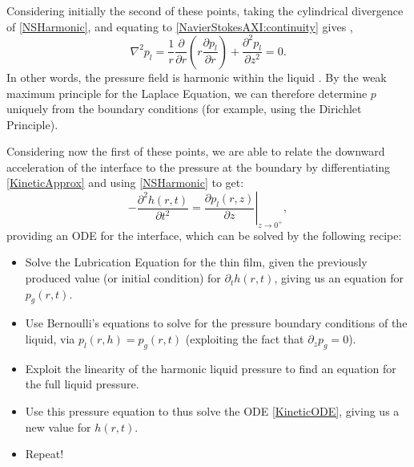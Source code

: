 \documentclass[11pt,a4paper]{article}
\begin{document}
	Considering initially the second of these points, taking the cylindrical divergence of \eqref{NSHarmonic}, and equating to \eqref{NavierStokesAXI:continuity} gives ,
	\begin{equation}
		\label{PressureLaplace}
		\nabla ^2 p_l = \frac{1}{r}\frac{\partial}{\partial r}\left(r \frac{\partial p_l}{\partial r}\right) + \frac{\partial^2 p_l}{\partial z^2} = 0.
	\end{equation}
	In other words, the pressure field is harmonic within the liquid . By the weak maximum principle for the Laplace Equation, we can therefore determine $p$ uniquely from the boundary conditions (for example, using the Dirichlet Principle). 
	
	Considering now the first of these points, we are able to relate the downward acceleration of the interface to the pressure at the boundary by differentiating \eqref{KineticApprox} and using \eqref{NSHarmonic} to get:
	\begin{equation}
		\label{KineticODE}
		-\frac{\partial^2 h(r,t)}{\partial t^2} = \left.\frac{\partial p_l(r,z)}{\partial z}\right|_{z \to 0^+},
	\end{equation}		
	providing an ODE for the interface, which can be solved by the following recipe:
	\begin{itemize}
		\item Solve the Lubrication Equation for the thin film, given the previously produced value (or initial condition) for $\partial_t h(r,t)$, giving us an equation for $p_g(r,t)$.
		\item Use Bernoulli's equations to solve for the pressure boundary conditions of the liquid, via $p_l(r, h) = p_g(r, t)$ (exploiting the fact that $\partial _zp_g = 0$).
		\item Exploit the linearity of the harmonic liquid pressure to find an equation for the full liquid pressure.
		\item Use this pressure equation to thus solve the ODE \eqref{KineticODE}, giving us a new value for $h(r,t)$.
		\item Repeat!
	\end{itemize}
	
\end{document}
